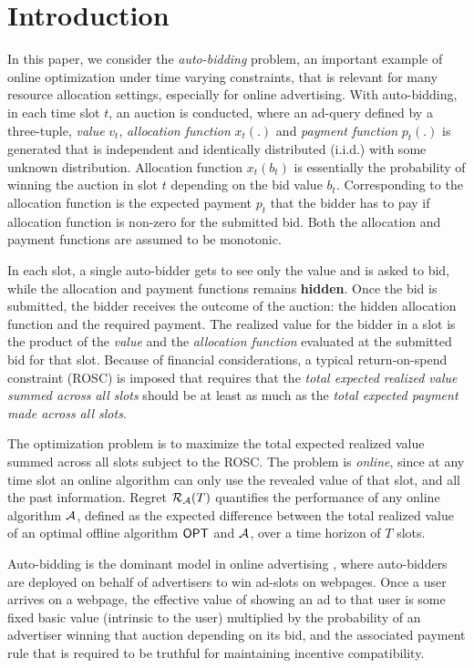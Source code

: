\section{Introduction}
In this paper, we consider the {\it auto-bidding} problem, an important example of online optimization under time varying constraints, that is relevant for many resource allocation settings, especially for online advertising. 
With auto-bidding, in each time slot $t$, an auction is conducted, where 
an ad-query defined by a three-tuple, {\it value} $v_t$, {\it allocation function} $x_t(.)$ and {\it payment function} $p_t(.)$ is generated that is independent and identically distributed (i.i.d.) with some unknown distribution. 
Allocation function $x_t(b_t)$ is essentially the probability of winning the auction in slot $t$ depending on the bid value $b_t$. 
Corresponding to the allocation function is the expected payment $p_t$ that the bidder has to pay if allocation function is non-zero for the submitted bid. Both the allocation and payment functions are assumed to be monotonic. 

In each slot, a single auto-bidder gets to see only the value  and is asked to bid, while the allocation and payment functions remains {\bf hidden}. 
Once the bid is submitted, the bidder receives the outcome of the auction: the hidden allocation function and the required payment. The realized value for the bidder in a slot is the product of the {\it value} and the {\it allocation function} evaluated at the submitted bid for that slot. 
Because of financial considerations, a typical return-on-spend  constraint (ROSC) is imposed that requires that the {\it total expected realized value summed across all slots} should be at least as much as the {\it total expected payment made across all slots}. 

The optimization problem is to maximize the total expected realized value summed across all slots subject to the ROSC. The problem is {\it online}, since at any time slot an online algorithm can only use the revealed value of that slot, and all the past information. Regret
$\mathcal{R}_{\mathcal{A}}(T)$ quantifies the performance of any online algorithm $\mathcal{A}$, defined as the expected difference between the total realized value of an optimal offline algorithm $\mathsf{OPT}$ and  $\mathcal{A}$, over a time horizon of $T$ slots.

Auto-bidding is the dominant model in online advertising \cite{balseiro2019learning, aggarwal2019autobidding, babaioff2020non, golrezaei2021auction, deng2021towards, balseiro2021robust, balseiro2021landscape}, where auto-bidders are deployed on behalf of advertisers to win ad-slots on webpages.
Once a user arrives on a webpage, the effective value of showing an ad to that user is some fixed basic value (intrinsic to the user) multiplied by the probability of an advertiser winning that auction depending on its bid, and the associated payment rule that is required to be truthful for maintaining 
incentive compatibility.

